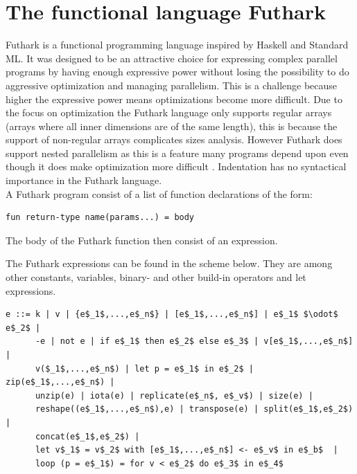 \documentclass[11pt]{article}
\begin{document}

\newpage

\section{The functional language Futhark}

Futhark is a functional programming language inspired by Haskell and Standard ML.
It was designed to be an attractive choice for expressing complex parallel programs by having enough expressive power without
losing the possibility to do aggressive optimization and managing parallelism.
This is a challenge because higher the expressive power means optimizations become more difficult. 
Due to the focus on optimization the Futhark language only supports regular arrays
(arrays where all inner dimensions are of the same length),
this is because the support of non-regular arrays  complicates sizes analysis.
However Futhark does support nested parallelism as this is a feature many programs 
depend upon even though it does make optimization more difficult \cite{TroelsHenriksen}.
Indentation has no syntactical importance in the Futhark language. \\



A Futhark program consist of a list of function declarations of the form:
\begin{lstlisting}[numbers=none,frame=none]
fun return-type name(params...) = body
\end{lstlisting}
The body of the Futhark function then consist of an expression. 

The Futhark expressions can be found in the scheme below. They are among other constants, variables, binary- and other build-in operators and let expressions.

\begin{lstlisting}[numbers=none,frame=none]
e ::= k | v | {e$_1$,...,e$_n$} | [e$_1$,...,e$_n$] | e$_1$ $\odot$ e$_2$ |
      -e | not e | if e$_1$ then e$_2$ else e$_3$ | v[e$_1$,...,e$_n$] |
      v($_1$,...,e$_n$) | let p = e$_1$ in e$_2$ | zip(e$_1$,...,e$_n$) | 
      unzip(e) | iota(e) | replicate(e$_n$, e$_v$) | size(e) |
      reshape((e$_1$,...,e$_n$),e) | transpose(e) | split(e$_1$,e$_2$) |
      concat(e$_1$,e$_2$) | 
      let v$_1$ = v$_2$ with [e$_1$,...,e$_n$] <- e$_v$ in e$_b$  |
      loop (p = e$_1$) = for v < e$_2$ do e$_3$ in e$_4$
\end{lstlisting}
\end{document}

